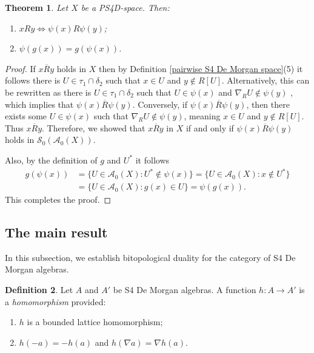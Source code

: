 \documentclass{amsart}
\theoremstyle{plain}
\newtheorem{theorem}{Theorem}[section]
\theoremstyle{definition}
\newtheorem{definition}[theorem]{Definition}
\begin{document}
    

\begin{theorem}\label{relational isomorphism}
    Let $X$ be a PS4D-space. Then: 
    \begin{enumerate}
        \item $xRy\Longleftrightarrow\psi(x)R\psi(y)$; 
        \item $\psi(g(x))=g(\psi(x))$. 
    \end{enumerate}
\end{theorem}
\begin{proof}


If $x\overline{R}y$ holds in $X$ then by Definition \ref{pairwise S4 De Morgan space}(5) it follows there is $U \in \tau_1 \cap \delta_2$ such that $x \in U$ and $y \notin R[U]$. Alternatively, this can be rewritten as there is $U \in \tau_1 \cap \delta_2$ such that $U \in \psi(x)$ and $\nabla_R U \notin \psi(y)$%
, which implies that $\psi(x)\overline{R}\psi(y)$. Conversely, if $\psi(x)\overline{R}\psi(y)$, then there exists some $U \in \psi(x)$ such that $\nabla_R U \notin \psi(y)$, meaning $x \in U$ and $y \notin R[U]$. Thus $x\overline{R}y$.
Therefore, we showed that $x\overline{R}y$ in $X$ if and only if $\psi(x)\overline{R}\psi(y)$ holds in $\mathcal{S}_0(\mathcal{A}_0(X))$.

Also, by the definition of $g$ and $U^*$ it follows
\begin{align*}
g(\psi(x))&=\{U \in \mathcal{A}_0(X): U^*\notin \psi(x)\}=\{U \in \mathcal{A}_0(X): x\notin U^*\}\\&=\{U \in \mathcal{A}_0(X): g(x)\in U\}=\psi(g(x)).
\end{align*}
This completes the proof. 
\end{proof}

    


\subsection{The main result}
In this subsection, we establish bitopological duality for the category of S4 De Morgan algebras. 
\begin{definition} \label{De Morgan homomorphism}
    Let $A$ and $A'$ be S4 De Morgan algebras. A function $h\colon A\to A'$ is a \emph{homomorphism} provided: 
    \begin{enumerate}
        \item $h$ is a bounded lattice homomorphism; 
        \item $h(-a)=-h(a)$ and $h(\nabla a)=\nabla h(a)$. 
    \end{enumerate}
\end{definition}
\end{document}
